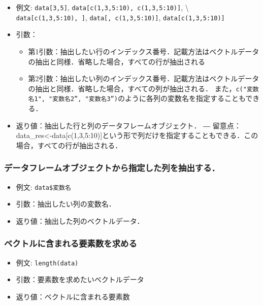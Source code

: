 \documentclass[
  xelatex, ja=standard]{bxjsarticle}
\providecommand{\tightlist}{%
  \setlength{\itemsep}{0pt}\setlength{\parskip}{0pt}}
\begin{document}
\begin{itemize}
\tightlist
\item
  例文: \texttt{data{[}3,5{]}},
  \texttt{data{[}c(1,3,5:10),\ c(1,3,5:10){]}}, \textbackslash{}
  \texttt{data{[}c(1,3,5:10),\ {]}}, \texttt{data{[},\ c(1,3,5:10){]}},
  \texttt{data{[}c(1,3,5:10){]}}
\item
  引数：

  \begin{itemize}
  \tightlist
  \item
    第1引数：抽出したい行のインデックス番号．記載方法はベクトルデータの抽出と同様．省略した場合，すべての行が抽出される
  \item
    第2引数：抽出したい列のインデックス番号．記載方法はベクトルデータの抽出と同様．省略した場合，すべての列が抽出される．
    また，\texttt{c("変数名1",\ "変数名2”,\ "変数名3”)}のように各列の変数名を指定することもできる．
  \end{itemize}
\item
  返り値：抽出した行と列のデータフレームオブジェクト． ―
  留意点：data\_res\textless-data{[}c(1,3,5:10){]}という形で列だけを指定することもできる．この場合，すべての行が抽出される．
\end{itemize}

\subsubsection{データフレームオブジェクトから指定した列を抽出する．}\label{ux30c7ux30fcux30bfux30d5ux30ecux30fcux30e0ux30aaux30d6ux30b8ux30a7ux30afux30c8ux304bux3089ux6307ux5b9aux3057ux305fux5217ux3092ux62bdux51faux3059ux308b}

\begin{itemize}
\tightlist
\item
  例文: \texttt{data\$変数名}
\item
  引数：抽出したい列の変数名．
\item
  返り値：抽出した列のベクトルデータ．
\end{itemize}

\subsubsection{ベクトルに含まれる要素数を求める}\label{ux30d9ux30afux30c8ux30ebux306bux542bux307eux308cux308bux8981ux7d20ux6570ux3092ux6c42ux3081ux308b}

\begin{itemize}
\tightlist
\item
  例文: \texttt{length(data)}
\item
  引数：要素数を求めたいベクトルデータ
\item
  返り値：ベクトルに含まれる要素数
\end{itemize}
\end{document}
